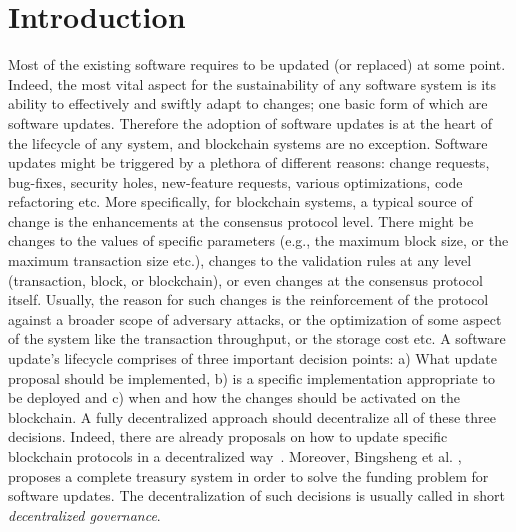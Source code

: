 \section{Introduction}

Most of the existing software requires to be updated (or replaced) at some point. Indeed, the most vital aspect for the sustainability of any software system is its ability to effectively and swiftly adapt to changes; one basic form of which are software updates. Therefore the adoption of software updates is at the heart of the lifecycle of any system, and blockchain systems are no exception. Software updates might be triggered by a plethora of different reasons: change requests, bug-fixes, security holes, new-feature requests, various optimizations, code refactoring etc.
More specifically, for blockchain systems, a typical source of change is the 
enhancements at the consensus protocol level. There might be changes to the 
values of specific parameters (e.g., the maximum block size, or the maximum 
transaction size etc.), changes to the validation rules at any level 
(transaction, block, or blockchain), or even changes at the consensus protocol 
itself. Usually, the reason for such changes is the reinforcement of the 
protocol against a broader scope of adversary attacks, or the optimization of 
some aspect of the system like the transaction throughput, or the storage cost 
etc.
A software update's lifecycle comprises of three important decision points: a) 
What update proposal should be implemented, b) is a specific implementation 
appropriate to be deployed and c) when and how the changes should be activated on the 
blockchain. A fully decentralized approach should decentralize all of these 
three decisions. Indeed, there are already proposals on how to update specific 
blockchain protocols in a decentralized way~\cite{dash,decred,tezos}. Moreover, 
Bingsheng et al. \cite{NDSS:ZhaOliBal19}, proposes a complete treasury system in
order to solve the funding problem for software updates. The decentralization 
of such decisions is usually called in short \emph{decentralized governance}.

